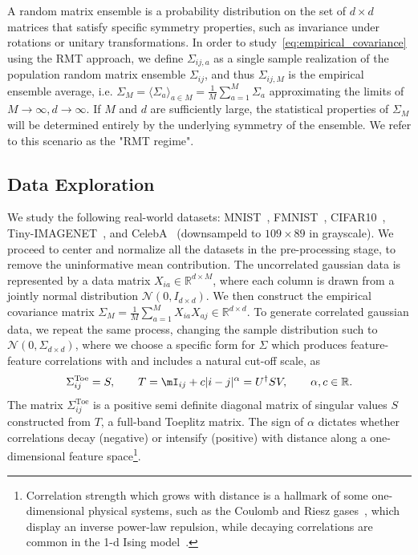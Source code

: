 \documentclass{article}
\begin{document}
A random matrix ensemble is a probability distribution on the set of $d\times d$ matrices that satisfy specific symmetry properties, such as invariance under rotations or unitary transformations.
In order to study~\cref{eq:empirical_covariance} using the RMT approach,  we define $\Sigma_{ij,a}$ as a single sample realization of the population random matrix ensemble $\Sigma_{ij}$, and thus $\Sigma_{ij,M}$ is the empirical ensemble average, i.e. $\Sigma_M = \langle \Sigma_a \rangle_{a\in M} =  \tfrac{1}{M}\sum_{a=1}^M\Sigma_a$ approximating the limits of $M \to \infty, d\to \infty$. If $M$ and $d$ are sufficiently large, the statistical properties of $\Sigma_M$ will be determined entirely by the underlying symmetry of the ensemble. We refer to this scenario as the "RMT regime".


\subsection{Data Exploration}
\label{exp}



We study the following real-world datasets:
MNIST~\citep{mnist}, FMNIST~\citep{fmnist}, CIFAR10~\citep{cifar10}, Tiny-IMAGENET~\citep{tinyimagenet}, and CelebA~\citep{celeba} (downsampeld to $109\times89$ in grayscale).
We proceed to center and normalize all the datasets in the pre-processing stage, to remove the uninformative mean contribution.
The uncorrelated gaussian data is represented by a data matrix $X_{ia}\in \mathbb{R}^{d \times M}$, where each column is drawn from a jointly normal distribution $\mathcal{N}(0, I_{d\times d})$. We then construct the empirical covariance matrix $\Sigma_M = \tfrac{1}{M} \sum_{a=1}^M X_{ia} X_{aj} \in \mathbb{R}^{d\times d}$. To generate correlated gaussian data, we repeat the same process, changing the sample distribution such to $\mathcal{N}(0, \Sigma_{d\times d})$, where we choose a specific form for $\Sigma$ which produces feature-feature correlations with and includes a natural cut-off scale, as
\begin{equation}
\label{eq:toeplitz}
    \Sigma_{ij}^\mathrm{Toe}
    =
    S, \qquad
    T
    = \mI_{ij} + c |i-j|^\alpha = U^\dagger S V,
    \qquad \alpha,c \in \mathbb{R}.
\end{equation}
The matrix $\Sigma_{ij}^\mathrm{Toe}$ is a positive semi definite diagonal matrix of singular values $S$ constructed from $T$, a full-band Toeplitz matrix. The sign of $\alpha$ dictates whether correlations decay (negative) or intensify (positive) with distance along a one-dimensional feature space\footnote{Correlation strength which grows with distance is a hallmark of some one-dimensional physical systems, such as the Coulomb and Riesz gases~\citep{Coulomb,Riesz}, which display an inverse power-law repulsion, while decaying correlations are common in the 1-d Ising model~\citep{ising}. }.
\end{document}
